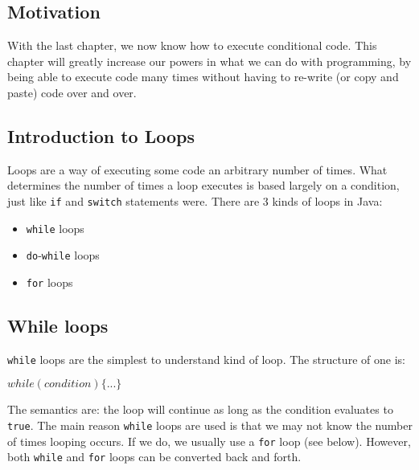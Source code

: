 
\subsection{Motivation}
With the last chapter, we now know how to execute conditional code. This chapter will greatly increase our powers in what we can do with programming, by being able to execute code many times without having to re-write (or copy and paste) code over and over.

\subsection{Introduction to Loops}
Loops are a way of executing some code an arbitrary number of times. What determines the number of times a loop executes is based largely on a condition, just like \verb|if| and \verb|switch| statements were. There are 3 kinds of loops in Java:
\begin{itemize}
\item \verb|while| loops
\item \verb|do|-\verb|while| loops
\item \verb|for| loops
\end{itemize}

\subsection{While loops}
\verb|while| loops are the simplest to understand kind of loop. The structure of one is:
\begin{center}
$while(condition) \{...\}$
\end{center}
The semantics are: the loop will continue as long as the condition evaluates to \verb|true|. The main reason \verb|while| loops are used is that we may not know the number of times looping occurs. If we do, we usually use a \verb|for| loop (see below). However, both \verb|while| and \verb|for| loops can be converted back and forth.

